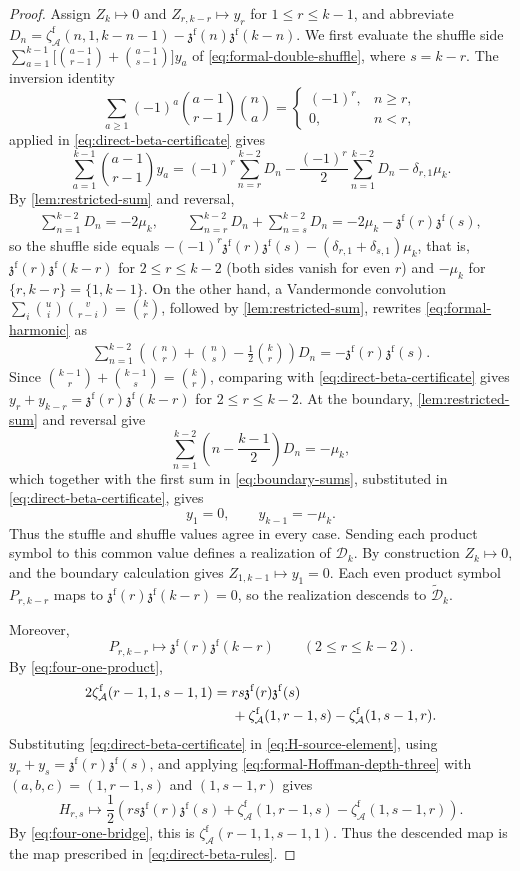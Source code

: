 \documentclass[10pt,a4paper]{amsart}
\newcommand{\Dk}{\mathcal D_k}
\newcommand{\Dtk}{\widetilde{\mathcal D}_k}
\newcommand{\zaf}[1]{\zeta_{\mathcal A}^{\mathrm f}(#1)}
\newcommand{\zzf}[1]{\mathfrak z^{\mathrm f}(#1)}
\begin{document}
\begin{proof}
Assign $Z_k\mapsto0$ and $Z_{r,k-r}\mapsto y_r$ for
$1\leq r\leq k-1$, and abbreviate
$D_n=\zaf{n,1,k-n-1}-\zzf n\zzf{k-n}$.
We first evaluate the shuffle side
$\sum_{a=1}^{k-1}\bigl[\binom{a-1}{r-1}+\binom{a-1}{s-1}\bigr]y_a$ of
\eqref{eq:formal-double-shuffle}, where $s=k-r$. The inversion
identity
\[
 \sum_{a\geq1}(-1)^a\binom{a-1}{r-1}\binom na=
 \begin{cases}
  (-1)^r,&n\geq r,\\
  0,&n<r,
 \end{cases}
\]
applied in \eqref{eq:direct-beta-certificate} gives
\[
 \sum_{a=1}^{k-1}\binom{a-1}{r-1}y_a
 =(-1)^r\sum_{n=r}^{k-2}D_n
 -\frac{(-1)^r}2\sum_{n=1}^{k-2}D_n
 -\delta_{r,1}\mu_k.
\]
By \cref{lem:restricted-sum} and reversal,
\begin{align}\label{eq:boundary-sums}
 \sum_{n=1}^{k-2}D_n=-2\mu_k,
 \qquad
 \sum_{n=r}^{k-2}D_n+\sum_{n=s}^{k-2}D_n=-2\mu_k-\zzf r\zzf s,
\end{align}
so the shuffle side equals
$-(-1)^r\zzf r\zzf s-(\delta_{r,1}+\delta_{s,1})\mu_k$, that is,
$\zzf r\zzf{k-r}$ for $2\leq r\leq k-2$ (both sides vanish for even
$r$) and $-\mu_k$ for $\{r,k-r\}=\{1,k-1\}$. On the other hand, a
Vandermonde convolution
$\sum_i\binom ui\binom v{r-i}=\binom kr$,
followed by \cref{lem:restricted-sum}, rewrites
\eqref{eq:formal-harmonic} as
\begin{align}\label{eq:harmonic-binomial-direct}
 \sum_{n=1}^{k-2}
 \left(\binom nr+\binom ns-\frac12\binom kr\right)D_n
 =-\zzf r\zzf s.
\end{align}
Since
$\binom{k-1}r+\binom{k-1}{s}=\binom kr$, comparing with
\eqref{eq:direct-beta-certificate} gives
$y_r+y_{k-r}=\zzf r\zzf{k-r}$ for
$2\leq r\leq k-2$. At the boundary,
\cref{lem:restricted-sum} and reversal give
\[
 \sum_{n=1}^{k-2}\left(n-\frac{k-1}{2}\right)D_n=-\mu_k,
\]
which together with the first sum in \eqref{eq:boundary-sums},
substituted in \eqref{eq:direct-beta-certificate}, gives
\[
 y_1=0,\qquad y_{k-1}=-\mu_k.
\]
Thus the stuffle and shuffle values agree in every case. Sending each
product symbol to this common value defines a realization of $\Dk$.
By construction $Z_k\mapsto0$, and the boundary calculation gives
$Z_{1,k-1}\mapsto y_1=0$. Each even product symbol $P_{r,k-r}$ maps to
$\zzf r\zzf{k-r}=0$, so the realization descends to $\Dtk$.

Moreover,
\[
 P_{r,k-r}\longmapsto\zzf r\zzf{k-r}
 \qquad(2\leq r\leq k-2).
\]
By
\eqref{eq:four-one-product},
\begin{align}\label{eq:four-one-bridge}
 2\zaf{r-1,1,s-1,1}={}&rs\zzf r\zzf s\notag\\
 &+\zaf{1,r-1,s}-\zaf{1,s-1,r}.
\end{align}
Substituting \eqref{eq:direct-beta-certificate} in
\eqref{eq:H-source-element}, using
$y_r+y_s=\zzf r\zzf s$, and applying
\eqref{eq:formal-Hoffman-depth-three} with
$(a,b,c)=(1,r-1,s)$ and $(1,s-1,r)$ gives
\[
 H_{r,s}\longmapsto\frac12\left(
 rs\zzf r\zzf s+\zaf{1,r-1,s}-\zaf{1,s-1,r}
 \right).
\]
By \eqref{eq:four-one-bridge}, this is
$\zaf{r-1,1,s-1,1}$. Thus the descended map is the map prescribed
in \eqref{eq:direct-beta-rules}.


\end{proof}
\end{document}
